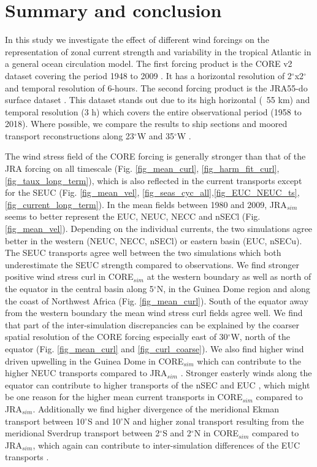 \documentclass[os, manuscript]{copernicus}
\begin{document}
	
	\section{Summary and conclusion}
	In this study we investigate the effect of different wind forcings on the representation of zonal current strength and variability in the tropical Atlantic in a general ocean circulation model. The first forcing product is the CORE v2 dataset covering the period 1948 to 2009 \citep{Griffies2009}. It has a horizontal resolution of 2$^{\circ}$x2$^{\circ}$ and temporal resolution of 6-hours. The second forcing product is the JRA55-do surface dataset \citep{Tsujino2018}. This dataset stands out due to its high horizontal (~55 km) and temporal resolution (3 h) which covers the entire observational period (1958 to 2018). Where possible, we compare the results to ship sections and moored transport reconstructions along 23$^{\circ}$W and 35$^{\circ}$W \citep{Brandt2021a,Burmeister2020,Tuchen2022}.
	
	The wind stress field of the CORE forcing is generally stronger than that of the JRA forcing on all timescale (Fig. \ref{fig_mean_curl}, \ref{fig_harm_fit_curl}, \ref{fig_taux_long_term}), which is also reflected in the current transports except for the SEUC (Fig. \ref{fig_mean_vel}, \ref{fig_seas_cyc_all},\ref{fig_EUC_NEUC_ts},\ref{fig_current_long_term}). In the mean fields between 1980 and 2009, JRA$_{sim}$ seems to better represent the EUC, NEUC, NECC and nSECl (Fig. \ref{fig_mean_vel}). Depending on the individual currents, the two simulations agree better in the western (NEUC, NECC, nSECl) or eastern basin (EUC, nSECu). The SEUC transports agree well between the two simulations which both underestimate the SEUC strength compared to observations. We find stronger positive wind stress curl in CORE$_{sim}$ at the western boundary as well as north of the equator in the central basin along 5$^{\circ}$N, in the Guinea Dome region and along the coast of Northwest Africa (Fig. \ref{fig_mean_curl}). South of the equator away from the western boundary the mean wind stress curl fields agree well. We find that part of the inter-simulation discrepancies can be explained by the coarser spatial resolution of the CORE forcing especially east of 30$^{\circ}$W, north of the equator (Fig. \ref{fig_mean_curl} and \ref{fig_curl_coarse}). We also find higher wind driven upwelling in the Guinea Dome in CORE$_{sim}$ which can contribute to the higher NEUC transports compared to JRA$_{sim}$ \citep{Stramma2005,Huettl2008,Goes2013}. Stronger easterly winds along the equator can contribute to higher transports of the nSEC and EUC \citep{Wacongne1989}, which might be one reason for the higher mean current transports in CORE$_{sim}$ compared to JRA$_{sim}$. Additionally we find higher divergence of the meridional Ekman transport between 10$^{\circ}$S and 10$^{\circ}$N and higher zonal transport resulting from the meridional Sverdrup transport between 2$^{\circ}$S and 2$^{\circ}$N in CORE$_{sim}$ compared to JRA$_{sim}$, which again can contribute to inter-simulation differences of the EUC transports \citep{Brandt2021a,Arhan2006}. 
	
\end{document}
